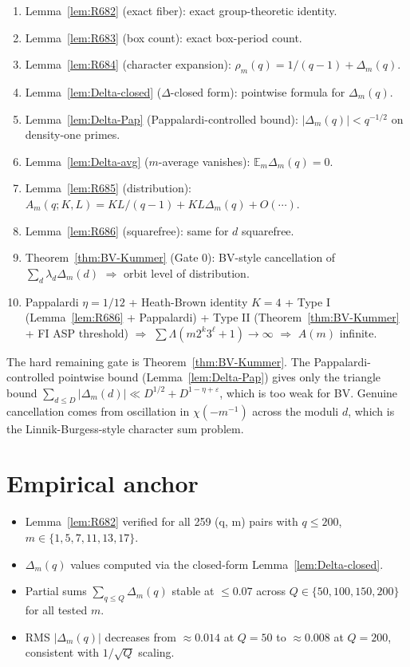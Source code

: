 \documentclass[12pt]{amsart}
\theoremstyle{definition}
\theoremstyle{remark}
\begin{document}
\begin{enumerate}
\item Lemma~\ref{lem:R682} (exact fiber): exact group-theoretic identity.
\item Lemma~\ref{lem:R683} (box count): exact box-period count.
\item Lemma~\ref{lem:R684} (character expansion): $\rho_m(q) = 1/(q-1) + \Delta_m(q)$.
\item Lemma~\ref{lem:Delta-closed} ($\Delta$-closed form): pointwise formula for $\Delta_m(q)$.
\item Lemma~\ref{lem:Delta-Pap} (Pappalardi-controlled bound): $|\Delta_m(q)| < q^{-1/2}$ on density-one primes.
\item Lemma~\ref{lem:Delta-avg} ($m$-average vanishes): $\mathbb{E}_m \Delta_m(q) = 0$.
\item Lemma~\ref{lem:R685} (distribution): $A_m(q; K, L) = KL/(q-1) + KL \Delta_m(q) + O(\cdots)$.
\item Lemma~\ref{lem:R686} (squarefree): same for $d$ squarefree.
\item Theorem~\ref{thm:BV-Kummer} (Gate 0): BV-style cancellation of $\sum_d \lambda_d \Delta_m(d)$ \(\Longrightarrow\) orbit level of distribution.
\item Pappalardi $\eta = 1/12$ + Heath-Brown identity $K = 4$ + Type I (Lemma~\ref{lem:R686} + Pappalardi) + Type II (Theorem~\ref{thm:BV-Kummer} + FI ASP threshold) \(\Longrightarrow\) $\sum \Lambda(m 2^k 3^\ell + 1) \to \infty$ \(\Longrightarrow\) $A(m)$ infinite.
\end{enumerate}

The hard remaining gate is Theorem~\ref{thm:BV-Kummer}. The Pappalardi-controlled pointwise
bound (Lemma~\ref{lem:Delta-Pap}) gives only the triangle bound
$\sum_{d \le D} |\Delta_m(d)| \ll D^{1/2} + D^{1-\eta+\varepsilon}$, which is too weak for BV.
Genuine cancellation comes from oscillation in $\chi(-m^{-1})$ across the moduli $d$, which
is the Linnik-Burgess-style character sum problem.

\section{Empirical anchor}

\begin{itemize}
\item Lemma~\ref{lem:R682} verified for all 259 (q, m) pairs with $q \le 200$, $m \in \{1, 5, 7, 11, 13, 17\}$.
\item $\Delta_m(q)$ values computed via the closed-form Lemma~\ref{lem:Delta-closed}.
\item Partial sums $\sum_{q \le Q} \Delta_m(q)$ stable at $\le 0.07$ across $Q \in \{50, 100, 150, 200\}$ for all tested $m$.
\item RMS $|\Delta_m(q)|$ decreases from $\approx 0.014$ at $Q = 50$ to $\approx 0.008$ at $Q = 200$, consistent with $1/\sqrt{Q}$ scaling.
\end{itemize}
\end{document}

